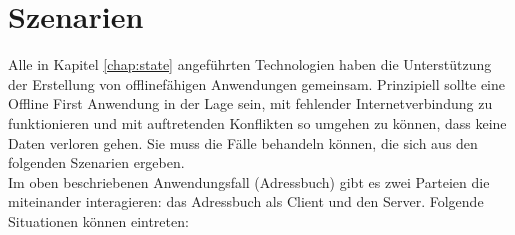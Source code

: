 \chapter{\label{chap:szenarien}Szenarien}
Alle in Kapitel \ref{chap:state} angeführten Technologien haben die Unterstützung der Erstellung von offlinefähigen Anwendungen gemeinsam.
Prinzipiell sollte eine Offline First Anwendung in der Lage sein, mit fehlender Internetverbindung zu funktionieren und mit auftretenden Konflikten so umgehen zu können, dass keine Daten verloren gehen. Sie muss die Fälle behandeln können, die sich aus den folgenden Szenarien ergeben.\\
Im oben beschriebenen Anwendungsfall (Adressbuch) gibt es zwei Parteien die miteinander interagieren: das Adressbuch als Client und den Server. Folgende Situationen können eintreten:
